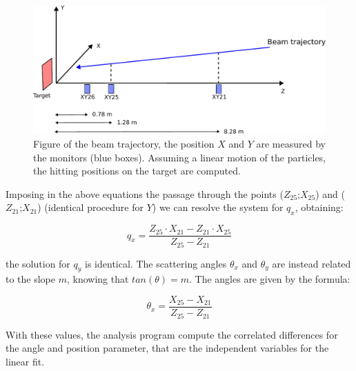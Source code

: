 \begin{appendices}
\begin{figure}[hbtp]
\centering
\includegraphics[scale=0.75]{Appendix/scheme.pdf}
\caption{Figure of the beam trajectory, the position $X$ and $Y$ are measured by the monitors (blue boxes). Assuming a linear motion of the particles, the hitting positions on the target are computed.}
\label{fig:BeamTraje}
\end{figure}

Imposing in the above equations the passage through the points ($Z_{25}$;$X_{25}$) and ($Z_{21}$;$X_{21}$) (identical procedure for $Y$) we can resolve the system for $q_{x}$, obtaining:

\begin{equation}
q_{x} = \dfrac{Z_{25} \cdot X_{21} - Z_{21} \cdot X_{25}}{Z_{25} - Z_{21}}
\end{equation} 

the solution for $q_{y}$ is identical. The scattering angles $\theta_{x}$ and $\theta_{y}$ are instead related to the slope $m$, knowing that $tan(\theta) = m$. The angles are given by the formula:

\begin{equation}
\theta_{x} = \dfrac{X_{25} - X_{21}}{Z_{25} - Z_{21}}
\end{equation}

With these values, the analysis program compute the correlated differences for the angle and position parameter, that are the independent variables for the linear fit.


\end{appendices}